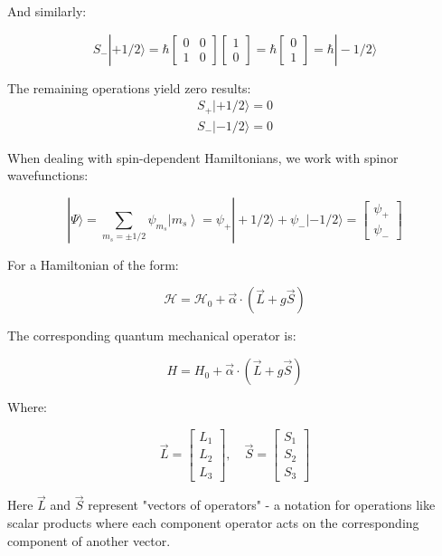 And similarly:

\[
S_{-}|+1/2\rangle=\hbar\left[\begin{array}{ll}
0 & 0  \\
1 & 0
\end{array}\right]\left[\begin{array}{l}
1 \\
0
\end{array}\right]=\hbar\left[\begin{array}{l}
0 \\
1
\end{array}\right]=\hbar|-1/2\rangle
\]


The remaining operations yield zero results:
\begin{align}
S_+|+1/2\rangle = 0\\
S_-|-1/2\rangle = 0
\end{align}

When dealing with spin-dependent Hamiltonians, we work with spinor wavefunctions:

\[
|\Psi\rangle=\sum_{m_{s}= \pm 1/2} \psi_{m_{s}}\left|m_{s}\right\rangle=\psi_{+}|+1/2\rangle+\psi_{-}|-1/2\rangle=\left[\begin{array}{l}
\psi_{+}  \\
\psi_{-}
\end{array}\right]
\]

For a Hamiltonian of the form:

\begin{equation}
\mathcal{H}=\mathcal{H}_{0}+\vec{\alpha} \cdot(\vec{L}+g \vec{S})
\end{equation}

The corresponding quantum mechanical operator is:

\begin{equation}
H=H_{0}+\vec{\alpha} \cdot(\vec{L}+g \vec{S})
\end{equation}

Where:

\[
\vec{L}=\left[\begin{array}{l}
L_{1}  \\
L_{2} \\
L_{3}
\end{array}\right], \quad \vec{S}=\left[\begin{array}{l}
S_{1} \\
S_{2} \\
S_{3}
\end{array}\right]
\]

Here $\vec{L}$ and $\vec{S}$ represent "vectors of operators" - a notation for operations like scalar products where each component operator acts on the corresponding component of another vector.

